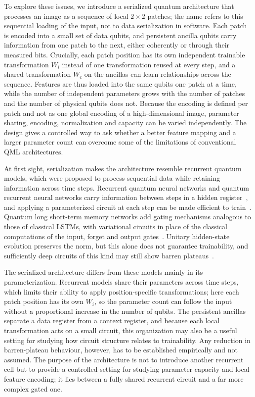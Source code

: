 \documentclass[11pt]{article}
\begin{document}
To explore these issues, we introduce a serialized quantum architecture that processes an image as a sequence of local $2\times2$ patches; the name refers to this sequential loading of the input, not to data serialization in software. Each patch is encoded into a small set of data qubits, and persistent ancilla qubits carry information from one patch to the next, either coherently or through their measured bits. Crucially, each patch position has its own independent trainable transformation $W_i$ instead of one transformation reused at every step, and a shared transformation $W_c$ on the ancillas can learn relationships across the sequence. Features are thus loaded into the same qubits one patch at a time, while the number of independent parameters grows with the number of patches and the number of physical qubits does not. Because the encoding is defined per patch and not as one global encoding of a high-dimensional image, parameter sharing, encoding, normalization and capacity can be varied independently. The design gives a controlled way to ask whether a better feature mapping and a larger parameter count can overcome some of the limitations of conventional QML architectures.

At first sight, serialization makes the architecture resemble recurrent quantum models, which were proposed to process sequential data while retaining information across time steps. Recurrent quantum neural networks and quantum recurrent neural networks carry information between steps in a hidden register~\cite{bausch2020recurrentqnn,li2023qrnn}, and applying a parameterized circuit at each step can be made efficient to train~\cite{siemaszko2023rapidqrnn}. Quantum long short-term memory networks add gating mechanisms analogous to those of classical LSTMs, with variational circuits in place of the classical computations of the input, forget and output gates~\cite{chen2022qlstm}. Unitary hidden-state evolution preserves the norm, but this alone does not guarantee trainability, and sufficiently deep circuits of this kind may still show barren plateaus~\cite{cerezo2021vqa,mcclean2018barren}.

The serialized architecture differs from these models mainly in its parameterization. Recurrent models share their parameters across time steps, which limits their ability to apply position-specific transformations; here each patch position has its own $W_i$, so the parameter count can follow the input without a proportional increase in the number of qubits. The persistent ancillas separate a data register from a context register, and because each local transformation acts on a small circuit, this organization may also be a useful setting for studying how circuit structure relates to trainability. Any reduction in barren-plateau behaviour, however, has to be established empirically and not assumed. The purpose of the architecture is not to introduce another recurrent cell but to provide a controlled setting for studying parameter capacity and local feature encoding; it lies between a fully shared recurrent circuit and a far more complex gated one.
\end{document}
